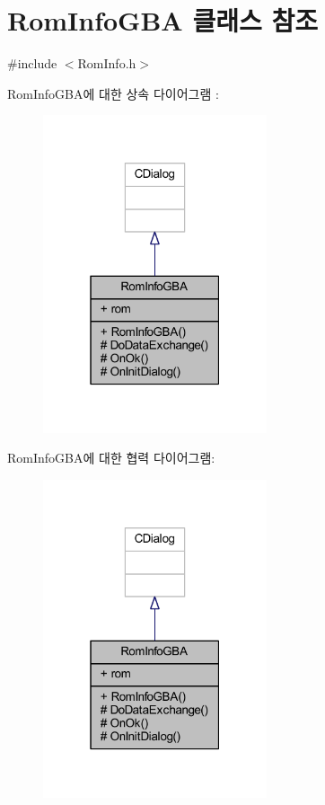 \hypertarget{class_rom_info_g_b_a}{}\section{Rom\+Info\+G\+BA 클래스 참조}
\label{class_rom_info_g_b_a}


{\ttfamily \#include $<$Rom\+Info.\+h$>$}



Rom\+Info\+G\+B\+A에 대한 상속 다이어그램 \+: \nopagebreak
\begin{figure}[H]
\begin{center}
\leavevmode
\includegraphics[width=187pt]{class_rom_info_g_b_a__inherit__graph}
\end{center}
\end{figure}


Rom\+Info\+G\+B\+A에 대한 협력 다이어그램\+:\nopagebreak
\begin{figure}[H]
\begin{center}
\leavevmode
\includegraphics[width=187pt]{class_rom_info_g_b_a__coll__graph}
\end{center}
\end{figure}
